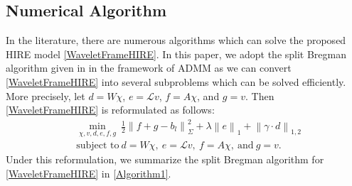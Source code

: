 \documentclass[reqno]{siamonline1116}
\numberwithin{theorem}{section}
\numberwithin{equation}{section}
\def\f{\frac}
\def\la{\langle}
\def\ra{\rangle}
\def\msL{{\mathscr L}}
\def\la{\langle}
\def\ra{\rangle}
\begin{document}

\subsection{Numerical Algorithm}\label{AlternatingMinimizationAlgorithm}

In the literature, there are numerous algorithms which can solve the proposed HIRE model \cref{WaveletFrameHIRE}. In this paper, we adopt the split Bregman algorithm given in \cite{C.Milovic2018} in the framework of ADMM \cite{J.Eckstein1992} as we can convert \cref{WaveletFrameHIRE} into several subproblems which can be solved efficiently. More precisely, let $d=W\chi$, $e=\msL v$, $f=A\chi$, and $g=v$. Then \cref{WaveletFrameHIRE} is reformulated as follows:
\begin{align*}
&\min_{\chi,v,d,e,f,g}~\f{1}{2}\left\|f+g-b_l\right\|_{\Sigma}^2+\lambda\left\|e\right\|_1+\left\|\gamma\cdot d\right\|_{1,2}\\
&\text{subject to}~d=W\chi,~e=\msL v,~f=A\chi,~\text{and}~g=v.
\end{align*}
Under this reformulation, we summarize the split Bregman algorithm for \cref{WaveletFrameHIRE} in \cref{Algorithm1}.
\end{document}
